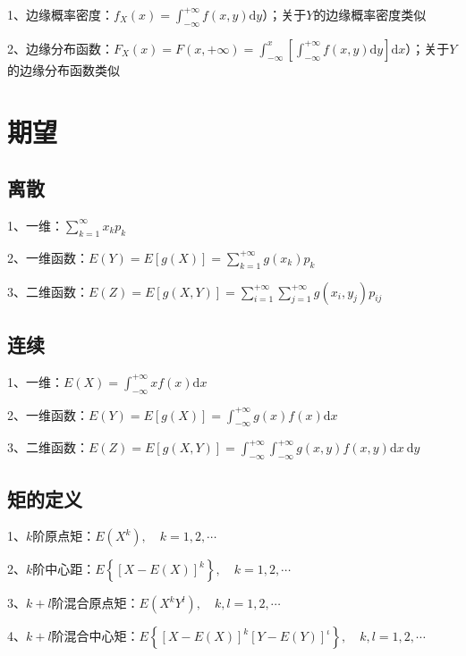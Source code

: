 1、边缘概率密度：$f_{X}(x)=\int_{-\infty}^{+\infty} f(x, y) \mathrm{d} y$）；关于$Y$的边缘概率密度类似

2、边缘分布函数：$F_{X}(x)=F(x,+\infty)=\int_{-\infty}^{x}\left[\int_{-\infty}^{+\infty} f(x, y) \mathrm{d} y\right] \mathrm{d} x$）；关于$Y$的边缘分布函数类似

\section{期望}



\subsection{离散}

1、一维：$\sum_{k=1}^{\infty}x_kp_k$

2、一维函数：$E(Y)=E[g(X)]=\sum_{k=1}^{+\infty} g\left(x_{k}\right) p_{k}$

3、二维函数：$E(Z)=E[g(X, Y)]=\sum_{i=1}^{+\infty} \sum_{j=1}^{+\infty} g\left(x_{i}, y_{j}\right) p_{i j}$



\subsection{连续}

1、一维：$E(X)=\int_{-\infty}^{+\infty} x f(x) \mathrm{d} x$

2、一维函数：$E(Y)=E[g(X)]=\int_{-\infty}^{+\infty} g(x) f(x) \mathrm{d} x$

3、二维函数：$E(Z)=E[g(X, Y)]=\int_{-\infty}^{+\infty} \int_{-\infty}^{+\infty} g(x, y) f(x, y) \mathrm{d} x \mathrm{~d} y$



\subsection{矩的定义}

1、$k$阶原点矩：$E\left(X^{k}\right), \quad k=1,2, \cdots $

2、$k$阶中心距：$E\left\{[X-E(X)]^{k}\right\}, \quad k=1,2, \cdots$

3、$k+l$阶混合原点矩：$E\left(X^{k} Y^{l}\right), \quad k, l=1,2, \cdots$

4、$k+l$阶混合中心矩：$E\left\{[X-E(X)]^{k}[Y-E(Y)]^{\iota}\right\}, \quad k, l=1,2, \cdots$



